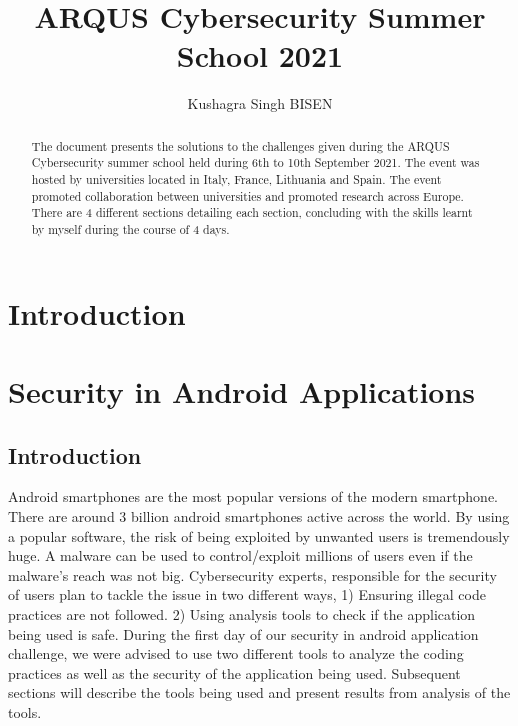 \documentclass[runningheads]{llncs}
\begin{document}
%
\title{ARQUS Cybersecurity Summer School 2021}
%
%
\author{Kushagra Singh BISEN}
%
%
%
\maketitle              %
%
\begin{abstract}
The document presents the solutions to the challenges given during the ARQUS Cybersecurity summer school held
during 6th to 10th September 2021. The event was hosted by universities located in Italy, France, Lithuania and Spain.
The event promoted collaboration between universities and promoted research across Europe. There are 4 different sections 
detailing each section, concluding with the skills learnt by myself during the course of 4 days.
\end{abstract}

\section{Introduction}


\section{Security in Android Applications}
\subsection{Introduction}
Android smartphones are the most popular versions of the modern smartphone. There are around 3 billion 
android smartphones active across the world. By using a popular software, the risk of being exploited by 
unwanted users is tremendously huge. A malware can be used to control/exploit millions of users even if the malware's
reach was not big. Cybersecurity experts, responsible for the security of users plan to tackle the issue in two different ways,
1) Ensuring illegal code practices are not followed. 2) Using analysis tools to check if the application being used is 
safe. During the first day of our security in android application challenge, we were advised to use 
two different tools to analyze the coding practices as well as the security of the application being used. Subsequent sections will describe 
the tools being used and present results from analysis of the tools.
\end{document}
